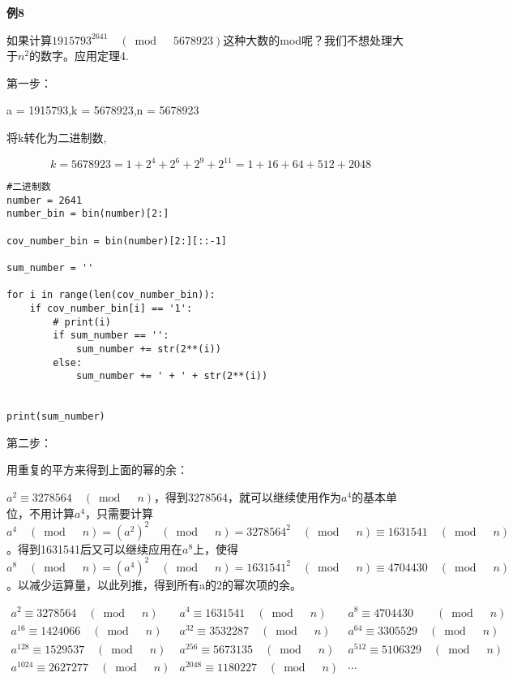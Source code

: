 \documentclass{article}
\begin{document}
\textbf{例8}

如果计算$1915793^{2641} \quad (\bmod \quad 5678923)$这种大数的mod呢？我们不想处理大于$n^2$的数字。应用定理4.

第一步：

a = 1915793,k = 5678923,n = 5678923

将k转化为二进制数,

$$k = 5678923 = 1 + 2^4+2^6+2^9+2^11 = 1+16+64+512+2048$$

\begin{lstlisting}
#二进制数
number = 2641
number_bin = bin(number)[2:]

cov_number_bin = bin(number)[2:][::-1]

sum_number = ''

for i in range(len(cov_number_bin)):
    if cov_number_bin[i] == '1':
        # print(i)
        if sum_number == '':
            sum_number += str(2**(i))
        else:
            sum_number += ' + ' + str(2**(i))
            

print(sum_number)
\end{lstlisting}

第二步：

用重复的平方来得到上面的幂的余：

$a^2 \equiv 3278564 \quad (\bmod \quad n)$，得到3278564，就可以继续使用作为$a^4$的基本单位，不用计算$a^4$，只需要计算$a^4 \quad (\bmod \quad n)= (a^2)^2 \quad (\bmod \quad n)= 3278564^2 \quad (\bmod \quad n) \equiv 1631541 \quad (\bmod \quad n)  $。得到1631541后又可以继续应用在$a^8$上，使得$a^8  \quad (\bmod \quad n) = (a^4)^2  \quad (\bmod \quad n) = 1631541^2  \quad (\bmod \quad n) \equiv 4704430  \quad (\bmod \quad n) $。以减少运算量，以此列推，得到所有a的2的幂次项的余。

$$
\begin{array}{lll}
a^{2} \equiv 3278564 \quad (\bmod \quad n) & a^{4} \equiv 1631541 \quad (\bmod \quad n) & a^{8} \equiv 4704430 \quad  \quad (\bmod \quad n) \\
a^{16} \equiv 1424066 \quad (\bmod  \quad n) & a^{32} \equiv 3532287 \quad (\bmod \quad n) & a^{64} \equiv 3305529 \quad (\bmod \quad n) \\
a^{128} \equiv 1529537 \quad (\bmod \quad n) & a^{256} \equiv 5673135 \quad (\bmod \quad n) & a^{512} \equiv 5106329 \quad (\bmod \quad n) \\
a^{1024} \equiv 2627277 \quad (\bmod \quad n) & a^{2048} \equiv 1180227 \quad (\bmod \quad n) & \cdots
\end{array}
$$
\end{document}

